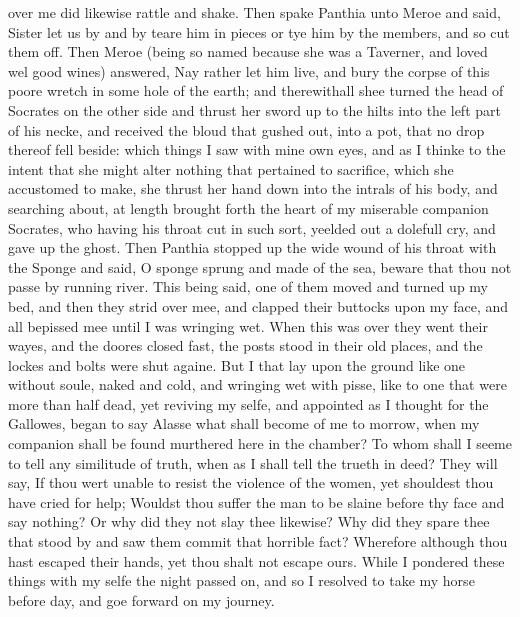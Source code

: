 over me did likewise rattle and shake. Then spake Panthia unto Meroe and said,
Sister let us by and by teare him in pieces or tye him by the members, and so
cut them off. Then Meroe (being so named because she was a Taverner, and loved
wel good wines) answered, Nay rather let him live, and bury the corpse of this
poore wretch in some hole of the earth; and therewithall shee turned the head
of Socrates on the other side and thrust her sword up to the hilts into the
left part of his necke, and received the bloud that gushed out, into a pot,
that no drop thereof fell beside: which things I saw with mine own eyes, and as
I thinke to the intent that she might alter nothing that pertained to
sacrifice, which she accustomed to make, she thrust her hand down into the
intrals of his body, and searching about, at length brought forth the heart of
my miserable companion Socrates, who having his throat cut in such sort,
yeelded out a dolefull cry, and gave up the ghost. Then Panthia stopped up the
wide wound of his throat with the Sponge and said, O sponge sprung and made of
the sea, beware that thou not passe by running river. This being said, one of
them moved and turned up my bed, and then they strid over mee, and clapped
their buttocks upon my face, and all bepissed mee until I was wringing wet.
When this was over they went their wayes, and the doores closed fast, the posts
stood in their old places, and the lockes and bolts were shut againe. But I
that lay upon the ground like one without soule, naked and cold, and wringing
wet with pisse, like to one that were more than half dead, yet reviving my
selfe, and appointed as I thought for the Gallowes, began to say Alasse what
shall become of me to morrow, when my companion shall be found murthered here
in the chamber? To whom shall I seeme to tell any similitude of truth, when as
I shall tell the trueth in deed? They will say, If thou wert unable to resist
the violence of the women, yet shouldest thou have cried for help; Wouldst thou
suffer the man to be slaine before thy face and say nothing? Or why did they
not slay thee likewise? Why did they spare thee that stood by and saw them
commit that horrible fact? Wherefore although thou hast escaped their hands,
yet thou shalt not escape ours. While I pondered these things with my selfe the
night passed on, and so I resolved to take my horse before day, and goe forward
on my journey.

